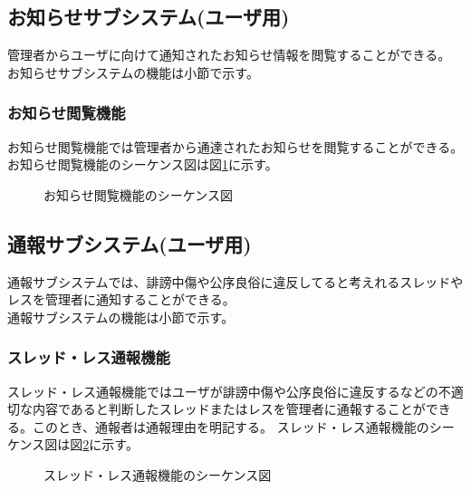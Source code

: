 \documentclass[a4j]{jarticle}
\begin{document}
  \subsection{お知らせサブシステム(ユーザ用)}
  管理者からユーザに向けて通知されたお知らせ情報を閲覧することができる。\\
  お知らせサブシステムの機能は小節で示す。
  \subsubsection{お知らせ閲覧機能}
  お知らせ閲覧機能では管理者から通達されたお知らせを閲覧することができる。
  お知らせ閲覧機能のシーケンス図は図\ref{fig:news_reading.png}に示す。

  \begin{figure}[H]
    \centering
    \caption{お知らせ閲覧機能のシーケンス図}
    \label{fig:news_reading.png}
  \end{figure}
  \subsection{通報サブシステム(ユーザ用)}
  通報サブシステムでは、誹謗中傷や公序良俗に違反してると考えれるスレッドやレスを管理者に通知することができる。\\
  通報サブシステムの機能は小節で示す。
  \subsubsection{スレッド・レス通報機能}
  スレッド・レス通報機能ではユーザが誹謗中傷や公序良俗に違反するなどの不適切な内容であると判断したスレッドまたはレスを管理者に通報することができる。このとき、通報者は通報理由を明記する。
  スレッド・レス通報機能のシーケンス図は図\ref{fig:bbs_report.png}に示す。
  \begin{figure}[H]
    \centering
    \caption{スレッド・レス通報機能のシーケンス図}
    \label{fig:bbs_report.png}
  \end{figure}
\end{document}
